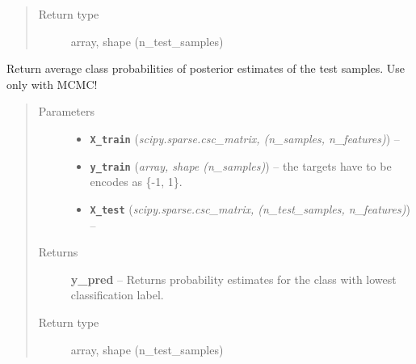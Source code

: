 \documentclass[letterpaper,10pt,english]{sphinxmanual}
\begin{document}
\begin{fulllineitems}
\begin{fulllineitems}
\begin{quote}
\begin{description}
\item[{Return type}] \leavevmode
array, shape (n\_test\_samples)

\end{description}\end{quote}

\end{fulllineitems}


\begin{fulllineitems}
\label{api:fastFM.mcmc.FMClassification.fit_predict_proba}
Return average class probabilities of posterior estimates of the
test samples.
Use only with MCMC!
\begin{quote}\begin{description}
\item[{Parameters}] \leavevmode\begin{itemize}
\item {} 
\textbf{\texttt{X\_train}} (\emph{scipy.sparse.csc\_matrix, (n\_samples, n\_features)}) -- 

\item {} 
\textbf{\texttt{y\_train}} (\emph{array, shape (n\_samples)}) -- the targets have to be encodes as \{-1, 1\}.

\item {} 
\textbf{\texttt{X\_test}} (\emph{scipy.sparse.csc\_matrix, (n\_test\_samples, n\_features)}) -- 

\end{itemize}

\item[{Returns}] \leavevmode
\textbf{y\_pred} --
Returns probability estimates for the class with lowest
classification label.

\item[{Return type}] \leavevmode
array, shape (n\_test\_samples)

\end{description}\end{quote}

\end{fulllineitems}


\end{fulllineitems}

\end{document}
